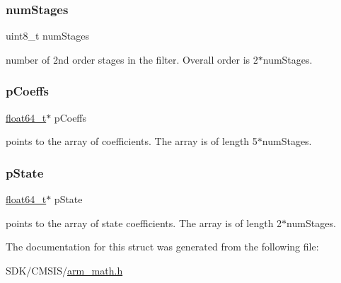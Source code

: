 \subsubsection{\texorpdfstring{num\+Stages}{numStages}}
{\footnotesize\ttfamily uint8\+\_\+t num\+Stages}

number of 2nd order stages in the filter. Overall order is 2$\ast$num\+Stages. \mbox{\label{structarm__biquad__cascade__df2_t__instance__f64_a2f5f42f60a50d7cb39837fd9b80cd8f0}} 
\subsubsection{\texorpdfstring{p\+Coeffs}{pCoeffs}}
{\footnotesize\ttfamily \mbox{\hyperlink{arm__math_8h_ac55f3ae81b5bc9053760baacf57e47f4}{float64\+\_\+t}}$\ast$ p\+Coeffs}

points to the array of coefficients. The array is of length 5$\ast$num\+Stages. \mbox{\label{structarm__biquad__cascade__df2_t__instance__f64_ae97c926a7e3a4bfe26fcdd0a3cc2f5c6}} 
\subsubsection{\texorpdfstring{p\+State}{pState}}
{\footnotesize\ttfamily \mbox{\hyperlink{arm__math_8h_ac55f3ae81b5bc9053760baacf57e47f4}{float64\+\_\+t}}$\ast$ p\+State}

points to the array of state coefficients. The array is of length 2$\ast$num\+Stages. 

The documentation for this struct was generated from the following file\+:\begin{DoxyCompactItemize}
\item 
S\+D\+K/\+C\+M\+S\+I\+S/\mbox{\hyperlink{arm__math_8h}{arm\+\_\+math.\+h}}\end{DoxyCompactItemize}

